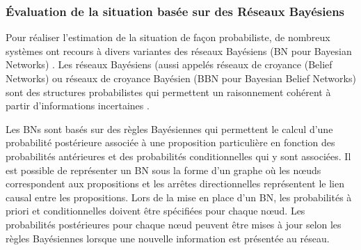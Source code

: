 \documentclass[a4paper,11pt,twoside]{StyleThese}
\begin{document}
\subsubsection{Évaluation de la situation basée sur des Réseaux Bayésiens}

Pour réaliser l'estimation de la situation de façon probabiliste, de nombreux systèmes ont recours à divers
variantes des réseaux Bayésiens (BN pour Bayesian Networks) \cite{bladon2002situation,das2002situation,higgins2005automatic}.
Les réseaux Bayésiens (aussi appelés réseaux de croyance (Belief Networks) ou réseaux de croyance Bayésien (BBN pour Bayesian Belief Networks) sont des structures probabilistes qui permettent un raisonnement cohérent à partir d'informations incertaines \cite{pearl1986fusion}.

Les BNs sont basés sur des règles Bayésiennes qui permettent le calcul d'une probabilité postérieure associée à une proposition particulière
en fonction des probabilités antérieures et des probabilités conditionnelles qui y sont associées.
Il est possible de représenter un BN sous la forme d'un graphe où les nœuds correspondent aux propositions et
les arrêtes directionnelles représentent le lien causal entre les propositions.
Lors de la mise en place d'un BN, les probabilités à priori et conditionnelles doivent être spécifiées pour
chaque nœud. Les probabilités postérieures pour chaque nœud peuvent être mises à jour selon les règles Bayésiennes lorsque
une nouvelle information est présentée au réseau.

\end{document}
